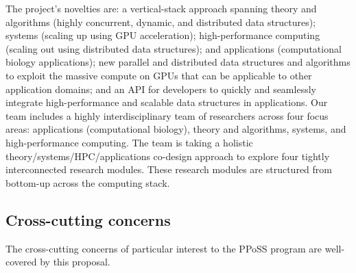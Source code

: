 
The project’s novelties are: a vertical-stack approach spanning theory and algorithms (highly concurrent, dynamic, and distributed data structures); systems (scaling up using GPU acceleration); high-performance computing (scaling out using distributed data structures); and applications (computational biology applications); new parallel and distributed data structures and algorithms to exploit the massive compute on GPUs that can be applicable to other application domains; and an API for developers to quickly and seamlessly integrate high-performance and scalable data structures in applications.
%
Our team includes a highly interdisciplinary team of researchers across four focus areas: applications (computational biology), theory and algorithms, systems, and high-performance computing. The team is taking a holistic theory/systems/HPC/applications co-design approach to explore four tightly interconnected research modules. These research modules are structured from bottom-up across the computing stack.


\subsection{Cross-cutting concerns}

The cross-cutting concerns of particular interest to the PPoSS program are well-covered by this proposal.

